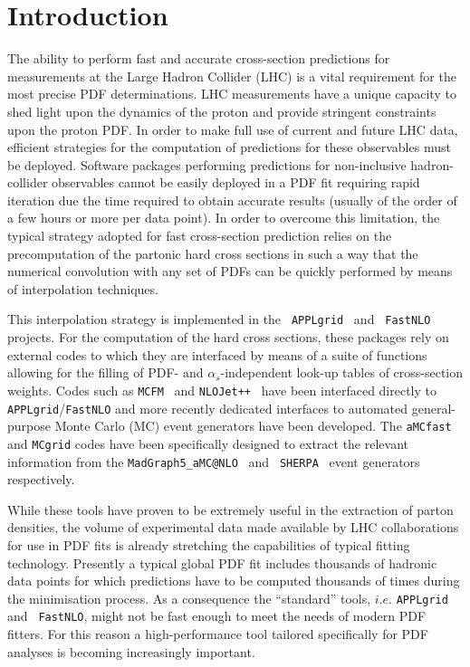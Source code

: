 \documentclass[preprint,12pt]{elsarticle}
\begin{document}
\clearpage


\section{Introduction}\label{sec:intro}

The ability to perform fast and accurate cross-section predictions for measurements at
the Large Hadron Collider (LHC) is a vital requirement for the most precise PDF determinations. LHC measurements have a unique
capacity to shed light upon the dynamics of the proton and provide stringent constraints upon 
the proton PDF. In order to make full use of current and future LHC data, efficient strategies
for the computation of predictions for these observables must be deployed. Software packages performing predictions 
for non-inclusive hadron-collider observables cannot be easily deployed in a PDF fit requiring rapid iteration due the time required to obtain accurate results (usually of the order of a few hours or more
per data point). In order to overcome this limitation, the typical strategy adopted for fast cross-section prediction relies on the precomputation
of the partonic hard cross sections in such a way that the numerical convolution with any set of PDFs can be quickly performed by means of interpolation techniques.

This interpolation strategy is implemented in the {\tt
  APPLgrid}~\cite{Carli:2010rw} and {\tt
  FastNLO}~\cite{Wobisch:2011ij} projects. For the computation of the hard
cross sections, these packages rely on external codes to which they
are interfaced by means of a suite of
functions allowing for the filling of PDF- and
$\alpha_s$-independent look-up tables of cross-section weights. Codes
such as {\tt MCFM}~\cite{Campbell:2010ff} and {\tt NLOJet++}~\cite{Nagy:2003tz} have been interfaced directly to 
 {\tt APPLgrid}/{\tt FastNLO} and more recently dedicated interfaces to
automated general-purpose Monte Carlo (MC) event generators have been
developed. The {\tt aMCfast} and {\tt MCgrid} codes
have been specifically designed to extract the relevant information
from the {\tt MadGraph5\_aMC@NLO}~\cite{Alwall:2014hca} and {\tt
  SHERPA}~\cite{Gleisberg:2008ta} event generators respectively.

While these tools have proven to be extremely useful in the
extraction of parton densities, the volume of experimental data
made available by LHC collaborations for use in PDF fits is already
stretching the capabilities of typical fitting technology. Presently a typical global PDF fit includes
thousands of hadronic data points for which predictions have to be
computed thousands of times during the minimisation process. As a
consequence the ``standard'' tools, $i.e.$ {\tt APPLgrid} and {\tt
  FastNLO}, might not be fast enough to meet the needs of modern
PDF fitters. For this reason a high-performance tool tailored specifically 
for PDF analyses is becoming increasingly important.
\end{document}
